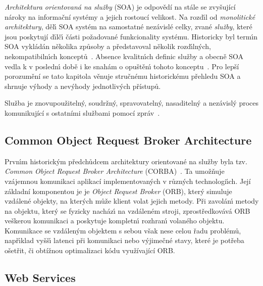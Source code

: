 \textit{Architektura orientovaná na služby} (\gls{SOA}) je odpovědí na stále se zvyšující
nároky na informační systémy a jejich rostoucí velikost. Na rozd\'{\i}l od \textit{monolitické architektury},
děl\'{\i} \gls{SOA} systém na samostatné nezávislé celky, zvané \textit{služby}, které jsou
poskytují d\'{\i}lč\'{\i} části požadované funkcionality systému.
Historicky byl term\'{\i}n \gls{SOA} vykládán několika způsoby a představoval
několik rozd\'{\i}ln\'ych, nekompatibiln\'{\i}ch konceptů~\cite{fowler2005serviceorientedambiguity}.
Absence kvalitn\'{\i}ch definic služby a obecně \gls{SOA} vedla k v posledn\'{\i} době i ke snahám
o opuštěn\'{\i} tohoto konceptu~\cite{cerny2017disambiguation}.
Pro lepší porozumění se tato kapitola věnuje stručnému historickému přehledu \gls{SOA}
a shrnuje výhody a nevýhody jednotlivých přístupů.

\begin{definition}
    Služba je znovupoužitelný, soudržný, spravovatelný, nasaditelný a nezávislý proces komunikující
    s ostatními službami pomocí zpráv~\cite{dragoni2017microservices, papazoglou2003service}.
\end{definition}

\subsection{Common Object Request Broker Architecture}\label{sec:corba}

Prvn\'{\i}m historick\'ym předchůdcem architektury orientované na služby
byla tzv. \textit{Common Object Request Broker Architecture}
(\gls{CORBA})~\cite{siegel2000corba}. Ta umožňuje vzájemnou komunikaci aplikací
implementovan\'ych v různ\'ych technologi\'{\i}ch. Její základní komponentou je
je \textit{Object Request Broker} (\gls{ORB}), kter\'y simuluje vzdálené objekty,
na kter\'ych může klient volat jejich metody. Při zavolán\'{\i} metody
na objektu, kter\'y se fyzicky nacház\'{\i} na vzdáleném stroji,
zprostředkovává \gls{ORB} veškerou komunikaci a poskytuje kompletn\'{\i} rozhran\'{\i}
volaného objektu. Komunikace se vzdálen\'ym objektem s sebou však nese celou řadu problémů,
např\'{\i}klad vyšš\'{\i} latenci při komunikaci nebo v\'yjimečné stavy, které je potřeba
ošetřit, či obtížnou optimalizaci kódu využívající \gls{ORB}.

\subsection{Web Services}

